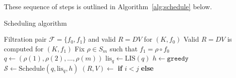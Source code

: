 \documentclass[sn-mathphys]{sn-jnl}
\begin{document}
These sequence of steps is outlined in Algorithm~\ref{alg:schedule} below.

\begin{algorithm}[h]
	\caption{Scheduling algorithm}\label{alg:schedule}
    \begin{algorithmic}[1]
    	\Require Filtration pair $\mathcal{F} = \{f_0, f_1\}$ and valid $R = DV$ for $(K,f_0)$
    	\Ensure Valid $R = D V$ is computed for $(K, f_1)$
    		\State Fix $\rho \in S_m$ such that $f_1 = \rho \circ f_0$  
    		\State $q \gets  (\rho(1), \rho(2), \ldots, \rho(m) )$ 
    		\State $\mathrm{lis}_{q} \gets \mathrm{LIS}(q)$ 
			\State $h \gets \texttt{greedy}$ 
    		\State $\mathcal{S} \gets \mathrm{Schedule}(q, \mathrm{lis}_{q}, h)$ 
	    	 
	    		\State $(R, V) \gets$ \textbf{if} $i < j$  \textbf{else} 
	    	\EndFor
    	\EndProcedure
	\end{algorithmic}
\end{algorithm}
\end{document}
